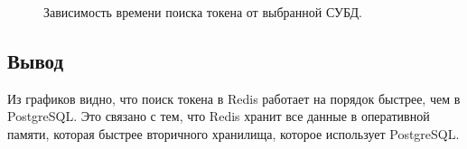 \begin{figure}[H]
	\centering
	\captionsetup{justification=centering}
	\caption{Зависимость времени поиска токена от выбранной СУБД.}
	\label{plt:time}
\end{figure}

\subsection*{Вывод}

Из графиков видно, что поиск токена в Redis работает на порядок быстрее, чем в PostgreSQL. Это связано с тем, что Redis хранит все данные в оперативной памяти, которая быстрее вторичного хранилища, которое использует PostgreSQL.

